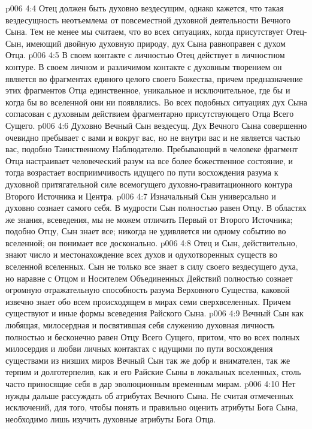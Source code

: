 \vs p006 4:4 Отец должен быть духовно вездесущим, однако кажется, что такая вездесущность неотъемлема от повсеместной духовной деятельности Вечного Сына. Тем не менее мы считаем, что во всех ситуациях, когда присутствует Отец\hyp{}Сын, имеющий двойную духовную природу, дух Сына равноправен с духом Отца.
\vs p006 4:5 В своем контакте с личностью Отец действует в личностном контуре. В своем личном и различимом контакте с духовным творением он является во фрагментах единого целого своего Божества, причем предназначение этих фрагментов Отца единственное, уникальное и исключительное, где бы и когда бы во вселенной они ни появлялись. Во всех подобных ситуациях дух Сына согласован с духовным действием фрагментарно присутствующего Отца Всего Сущего.
\vs p006 4:6 Духовно Вечный Сын вездесущ. Дух Вечного Сына совершенно очевидно пребывает с вами и вокруг вас, но не внутри вас и не является частью вас, подобно Таинственному Наблюдателю. Пребывающий в человеке фрагмент Отца настраивает человеческий разум на все более божественное состояние, и тогда возрастает восприимчивость идущего по пути восхождения разума к духовной притягательной силе всемогущего духовно\hyp{}гравитационного контура Второго Источника и Центра.
\vs p006 4:7 \pc Изначальный Сын универсально и духовно сознает самого себя. В мудрости Сын полностью равен Отцу. В областях же знания, всеведения, мы не можем отличить Первый от Второго Источника; подобно Отцу, Сын знает все; никогда не удивляется ни одному событию во вселенной; он понимает все досконально.
\vs p006 4:8 \pc Отец и Сын, действительно, знают число и местонахождение всех духов и одухотворенных существ во вселенной вселенных. Сын не только все знает в силу своего вездесущего духа, но наравне с Отцом и Носителем Объединенных Действий полностью сознает огромную отражательную способность разума Верховного Существа, каковой извечно знает обо всем происходящем в мирах семи сверхвселенных. Причем существуют и иные формы всеведения Райского Сына.
\vs p006 4:9 \pc Вечный Сын как любящая, милосердная и посвятившая себя служению духовная личность полностью и бесконечно равен Отцу Всего Сущего, притом, что во всех полных милосердия и любви личных контактах с идущими по пути восхождения существами из низших миров Вечный Сын так же добр и внимателен, так же терпим и долготерпелив, как и его Райские Сыны в локальных вселенных, столь часто приносящие себя в дар эволюционным временным мирам.
\vs p006 4:10 Нет нужды дальше рассуждать об атрибутах Вечного Сына. Не считая отмеченных исключений, для того, чтобы понять и правильно оценить атрибуты Бога Сына, необходимо лишь изучить духовные атрибуты Бога Отца.
